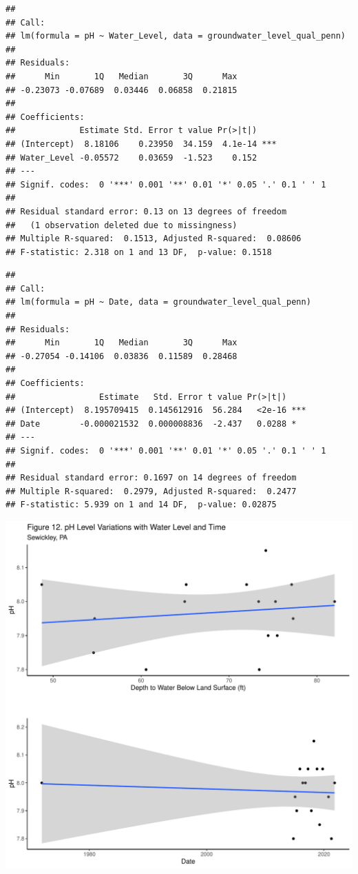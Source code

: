 \documentclass[
  12pt,
]{article}
\begin{document}
\newpage

\begin{verbatim}
## 
## Call:
## lm(formula = pH ~ Water_Level, data = groundwater_level_qual_penn)
## 
## Residuals:
##      Min       1Q   Median       3Q      Max 
## -0.23073 -0.07689  0.03446  0.06858  0.21815 
## 
## Coefficients:
##             Estimate Std. Error t value Pr(>|t|)    
## (Intercept)  8.18106    0.23950  34.159  4.1e-14 ***
## Water_Level -0.05572    0.03659  -1.523    0.152    
## ---
## Signif. codes:  0 '***' 0.001 '**' 0.01 '*' 0.05 '.' 0.1 ' ' 1
## 
## Residual standard error: 0.13 on 13 degrees of freedom
##   (1 observation deleted due to missingness)
## Multiple R-squared:  0.1513, Adjusted R-squared:  0.08606 
## F-statistic: 2.318 on 1 and 13 DF,  p-value: 0.1518
\end{verbatim}

\begin{verbatim}
## 
## Call:
## lm(formula = pH ~ Date, data = groundwater_level_qual_penn)
## 
## Residuals:
##      Min       1Q   Median       3Q      Max 
## -0.27054 -0.14106  0.03836  0.11589  0.28468 
## 
## Coefficients:
##                 Estimate   Std. Error t value Pr(>|t|)    
## (Intercept)  8.195709415  0.145612916  56.284   <2e-16 ***
## Date        -0.000021532  0.000008836  -2.437   0.0288 *  
## ---
## Signif. codes:  0 '***' 0.001 '**' 0.01 '*' 0.05 '.' 0.1 ' ' 1
## 
## Residual standard error: 0.1697 on 14 degrees of freedom
## Multiple R-squared:  0.2979, Adjusted R-squared:  0.2477 
## F-statistic: 5.939 on 1 and 14 DF,  p-value: 0.02875
\end{verbatim}

\newpage

\includegraphics{Draft_Final_files/figure-latex/linear_m6-1.pdf}
\end{document}
